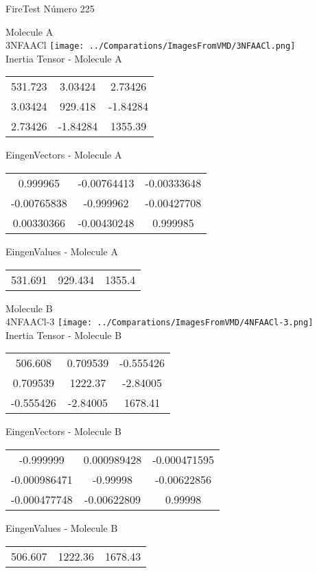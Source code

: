 \vtab[-2cm]
\begin{center}
{\large FireTest \tab Número 225}
\end{center}
\begin{multicols}{2}
\begin{center}

Molecule A \\ 
3NFAACl
\texttt{[image: ../Comparations/ImagesFromVMD/3NFAACl.png]}
\\
Inertia Tensor - Molecule A \\
\vtab

\begin{tabular}{|c c c|}
531.723	 & 	3.03424	 & 	2.73426	 \\
3.03424	 & 	929.418	 & 	-1.84284	 \\
2.73426	 & 	-1.84284	 & 	1355.39
\end{tabular}

\vtab
 EingenVectors - Molecule A     \\
\vtab
\begin{tabular}{|c c c|}
0.999965	 & 	-0.00764413	 & 	-0.00333648	 \\
-0.00765838	 & 	-0.999962	 & 	-0.00427708	 \\
0.00330366	 & 	-0.00430248	 & 	0.999985
\end{tabular}

\vtab
 EingenValues - Molecule A     \\
\vtab
\begin{tabular}{|c c c|}
531.691	 & 	929.434	 & 	1355.4	 \\
\end{tabular}
\columnbreak

Molecule B \\ 
4NFAACl-3
\texttt{[image: ../Comparations/ImagesFromVMD/4NFAACl-3.png]}
\\
Inertia Tensor - Molecule B \\
\vtab

\begin{tabular}{|c c c|}
506.608	 & 	0.709539	 & 	-0.555426	 \\
0.709539	 & 	1222.37	 & 	-2.84005	 \\
-0.555426	 & 	-2.84005	 & 	1678.41
\end{tabular}

\vtab
 EingenVectors - Molecule B     \\
\vtab
\begin{tabular}{|c c c|}
-0.999999	 & 	0.000989428	 & 	-0.000471595	 \\
-0.000986471	 & 	-0.99998	 & 	-0.00622856	 \\
-0.000477748	 & 	-0.00622809	 & 	0.99998
\end{tabular}

\vtab
 EingenValues - Molecule B     \\
\vtab
\begin{tabular}{|c c c|}
506.607	 & 	1222.36	 & 	1678.43	 \\
\end{tabular}

\end{center}
\end{multicols}
